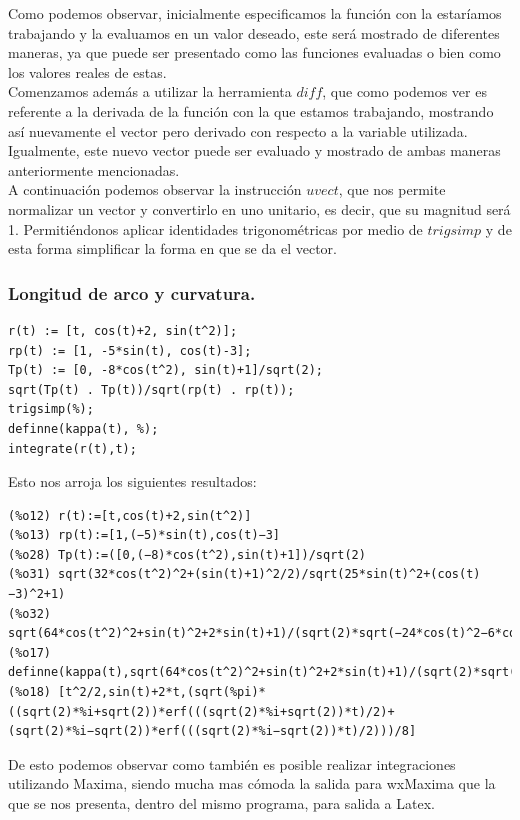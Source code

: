 \documentclass[12pt]{article}
\begin{document}
Como podemos observar, inicialmente especificamos la función con la estaríamos trabajando y la evaluamos en un valor deseado, este será mostrado de diferentes maneras, ya que puede ser presentado como las funciones evaluadas o bien como los valores reales de estas.\\

Comenzamos además a utilizar la herramienta $diff$, que como podemos ver es referente a la derivada de la función con la que estamos trabajando, mostrando así nuevamente el vector pero derivado con respecto a la variable utilizada. Igualmente, este nuevo vector puede ser evaluado y mostrado de ambas maneras anteriormente mencionadas.\\

A continuación podemos observar la instrucción $uvect$, que nos permite normalizar un vector y convertirlo en uno unitario, es decir, que su magnitud será 1. Permitiéndonos aplicar identidades trigonométricas por medio de $trigsimp$ y de esta forma simplificar la forma en que se da el vector.

\subsubsection*{Longitud de arco y curvatura.}
\begin{verbatim}
r(t) := [t, cos(t)+2, sin(t^2)];
rp(t) := [1, -5*sin(t), cos(t)-3];
Tp(t) := [0, -8*cos(t^2), sin(t)+1]/sqrt(2);
sqrt(Tp(t) . Tp(t))/sqrt(rp(t) . rp(t));
trigsimp(%);
definne(kappa(t), %);
integrate(r(t),t);
\end{verbatim}
Esto nos arroja los siguientes resultados:
\begin{verbatim}
(%o12) r(t):=[t,cos(t)+2,sin(t^2)]
(%o13) rp(t):=[1,(−5)*sin(t),cos(t)−3]
(%o28) Tp(t):=([0,(−8)*cos(t^2),sin(t)+1])/sqrt(2)
(%o31) sqrt(32*cos(t^2)^2+(sin(t)+1)^2/2)/sqrt(25*sin(t)^2+(cos(t)−3)^2+1)
(%o32) sqrt(64*cos(t^2)^2+sin(t)^2+2*sin(t)+1)/(sqrt(2)*sqrt(−24*cos(t)^2−6*cos(t)+35))
(%o17) definne(kappa(t),sqrt(64*cos(t^2)^2+sin(t)^2+2*sin(t)+1)/(sqrt(2)*sqrt(−24*cos(t)^2−6*cos(t)+35)))
(%o18) [t^2/2,sin(t)+2*t,(sqrt(%pi)*((sqrt(2)*%i+sqrt(2))*erf(((sqrt(2)*%i+sqrt(2))*t)/2)+(sqrt(2)*%i−sqrt(2))*erf(((sqrt(2)*%i−sqrt(2))*t)/2)))/8]
\end{verbatim}

De esto podemos observar como también es posible realizar integraciones utilizando Maxima, siendo mucha mas cómoda la salida para wxMaxima que la que se nos presenta, dentro del mismo programa, para salida a Latex.\\
\end{document}
